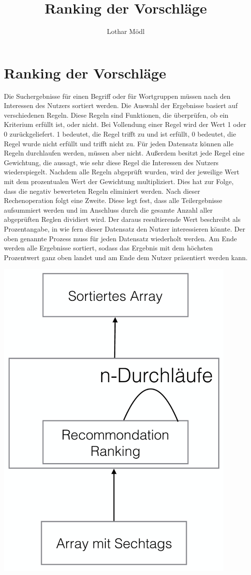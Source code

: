 \documentclass[a4paper,12pt]{article}
\title{Ranking der Vorschläge}
\author{Lothar Mödl}
\begin{document}
\section{Ranking der Vorschläge}

Die Suchergebnisse für einen Begriff oder  für Wortgruppen müssen nach den Interessen des Nutzers sortiert werden. Die Auswahl der Ergebnisse basiert auf verschiedenen Regeln. Diese Regeln sind Funktionen, die überprüfen, ob ein Kriterium erfüllt ist, oder nicht. Bei Vollendung einer Regel wird der Wert 1 oder 0 zurückgeliefert. 1 bedeutet, die Regel trifft zu und ist erfüllt, 0 bedeutet, die Regel wurde nicht erfüllt und trifft nicht zu. Für jeden Datensatz können alle Regeln durchlaufen werden, müssen aber nicht. Außerdem besitzt jede Regel eine Gewichtung, die aussagt, wie sehr diese Regel die Interessen des Nutzers wiederspiegelt. Nachdem alle Regeln abgeprüft wurden, wird der jeweilige Wert mit dem prozentualen Wert der Gewichtung multipliziert. Dies hat zur Folge, dass die negativ bewerteten Regeln eliminiert werden. Nach dieser Rechenoperation folgt eine Zweite. Diese legt fest, dass alle Teilergebnisse aufsummiert werden und im Anschluss durch die gesamte Anzahl aller abgeprüften Reglen dividiert wird. Der daraus resultierende Wert beschreibt als Prozentangabe, in wie fern dieser Datensatz den Nutzer interessieren könnte. Der oben genannte Prozess muss für jeden Datensatz wiederholt werden. Am Ende werden alle Ergebnisse sortiert, sodass das Ergebnis mit dem höchsten Prozentwert ganz oben landet und am Ende dem Nutzer präsentiert werden kann. 

\includegraphics[width=12cm]{Pics/rankinguebersicht}
\n\n\n
\end{document}
